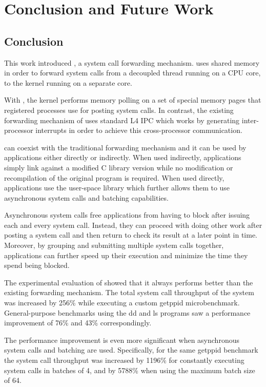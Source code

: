 \chapter{Conclusion and Future Work}
\label{chap:conclusion}

\section{Conclusion}

This work introduced \memsc, a system call forwarding mechanism. \memsc uses
shared memory in order to forward system calls from a decoupled \llinux thread
running on a CPU core, to the \llinux kernel running on a separate core.

With \memsc, the \llinux kernel performs memory polling on a set of special
memory pages that registered processes use for posting system calls. In
contrast, the existing forwarding mechanism of \llinux uses standard L4 IPC
which works by generating inter-processor interrupts in order to achieve this
cross-processor communication.

\memsc can coexist with the traditional forwarding mechanism and it can be used
by applications either directly or indirectly. When used indirectly,
applications simply link against a modified C library version while no
modification or recompilation of the original program is required. When used
directly, applications use the \memsc user-space library which further allows
them to use asynchronous system calls and batching capabilities.

Asynchronous system calls free applications from having to block after issuing
each and every system call. Instead, they can proceed with doing other work
after posting a system call and then return to check its result at a later
point in time. Moreover, by grouping and submitting multiple system calls
together, applications can further speed up their execution and minimize the
time they spend being blocked.

The experimental evaluation of \memsc showed that it always performs better
than the existing \llinux forwarding mechanism. The total system call
throughput of the system was increased by 256\% while executing a custom
getppid microbenchmark. General-purpose benchmarks using the dd and ls programs
saw a performance improvement of 76\% and 43\% correspondingly.

The performance improvement is even more significant when asynchronous system
calls and batching are used. Specifically, for the same getppid benchmark the
system call throughput was increased by 1196\% for constantly executing system
calls in batches of 4, and by 5788\% when using the maximum batch size of 64.

